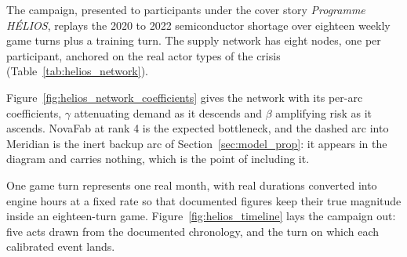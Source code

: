The campaign, presented to participants under the cover story \emph{Programme H\'ELIOS},
replays the 2020 to 2022 semiconductor shortage over eighteen weekly game turns plus a
training turn. The supply network has eight nodes, one per participant, anchored on the real
actor types of the crisis (Table~\ref{tab:helios_network}).

Figure~\ref{fig:helios_network_coefficients} gives the network with its per-arc coefficients,
$\gamma$ attenuating demand as it descends and $\beta$ amplifying risk as it ascends. NovaFab
at rank 4 is the expected bottleneck, and the dashed arc into Meridian is the inert backup arc
of Section~\ref{sec:model_prop}: it appears in the diagram and carries nothing, which is the
point of including it.

One game turn represents one real month, with real durations converted into engine hours at a
fixed rate so that documented figures keep their true magnitude inside an eighteen-turn game.
Figure~\ref{fig:helios_timeline} lays the campaign out: five acts drawn from the documented
chronology, and the turn on which each calibrated event lands.

